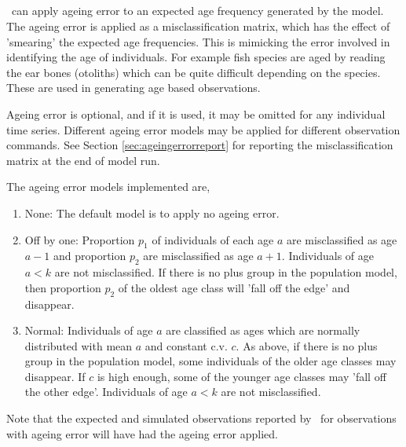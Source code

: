 \subsection{}\label{subsec:ageing_error}
\IBM\ can apply ageing error to an expected age frequency generated by the model. The ageing error is applied as a misclassification matrix, which has the effect of 'smearing' the expected age frequencies. This is mimicking the error involved in identifying the age of individuals. For example fish species are aged by reading the ear bones (otoliths) which can be quite difficult depending on the species. These are used in generating age based observations. 

Ageing error is optional, and if it is used, it may be omitted for any individual time series. Different ageing error models may be applied for different observation commands. See Section \ref{sec:ageingerrorreport} for reporting the misclassification matrix at the end of model run.

The ageing error models implemented are,
\begin{enumerate}
	\item{None}: The default model is to apply no ageing error.
	\item{Off by one}: Proportion $p_1$ of individuals of each age $a$ are misclassified as age $a-1$ and proportion $p_2$ are misclassified as age $a+1$. Individuals of age $a < k$ are not misclassified. If there is no plus group in the population model, then proportion $p_2$ of the oldest age class will 'fall off the edge' and disappear. 
	\item{Normal}: Individuals of age $a$ are classified as ages which are normally distributed with mean $a$ and constant c.v. $c$. As above, if there is no plus group in the population model, some individuals of the older age classes may disappear. If $c$ is high enough, some of the younger age classes may 'fall off the other edge'. Individuals of age $a < k$ are not misclassified.
\end{enumerate}

Note that the expected and simulated observations reported by \IBM\ for observations with ageing error will have had the ageing error applied. 


